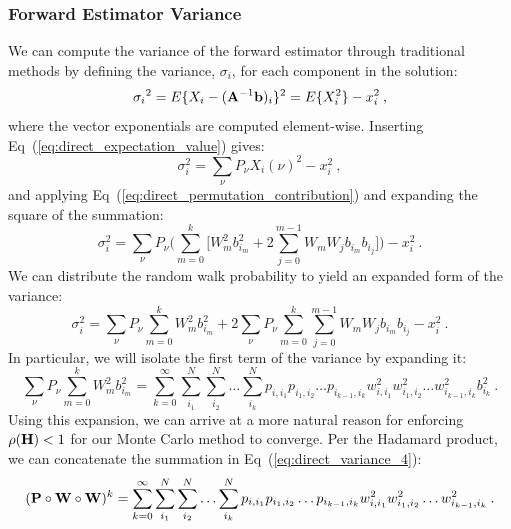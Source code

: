 \subsubsection{Forward Estimator Variance}
\label{subsec:forward_variance}
We can compute the variance of the forward estimator through traditional
methods by defining the variance, $\sigma_i$, for each component in
the solution:
\begin{equation}
  {\sigma_i}^2 = E\{X_i - (\mathbf{A}^{-1}\mathbf{b})_i\}^2 = E\{X_i^2\} - x_i^2\:,
  \label{eq:direct_variance_1}
\end{equation}
where the vector exponentials are computed element-wise. Inserting
Eq~(\ref{eq:direct_expectation_value}) gives:
\begin{equation}
  \sigma_i^2 = \sum_{\nu} P_{\nu} X_{i}(\nu)^2 - x_i^2\:,
  \label{eq:direct_variance_2}
\end{equation}
and applying Eq~(\ref{eq:direct_permutation_contribution}) and
expanding the square of the summation:
\begin{equation}
  \sigma_i^2 = \sum_{\nu} P_{\nu} \Big(\sum_{m=0}^k \Big[ W_{m}^2 b_{i_m}^2
  + 2 \sum_{j=0}^{m-1} W_m W_j b_{i_m} b_{i_j} \Big] \Big)-
  x_i^2\:.
  \label{eq:direct_variance_3}
\end{equation}
We can distribute the random walk probability to yield an expanded
form of the variance:
\begin{equation}
  \sigma_i^2 = \sum_{\nu} P_{\nu} \sum_{m=0}^k W_{m}^2 b_{i_m}^2 + 2
  \sum_{\nu} P_{\nu} \sum_{m=0}^k \sum_{j=0}^{m-1} W_m W_j b_{i_m}
  b_{i_j} - x_i^2\:.
  \label{eq:direct_variance_3_2}
\end{equation}
In particular, we will isolate the first term of the variance by
expanding it:
\begin{equation}
  \sum_{\nu} P_{\nu} \sum_{m=0}^k W_{m}^2 b_{i_m}^2 =
  \sum_{k=0}^{\infty}\sum_{i_1}^{N}\sum_{i_2}^{N}\ldots \sum_{i_k}^{N}
  p_{i,i_1}p_{i_1,i_2}\ldots p_{i_{k-1},i_k}
  w^2_{i,i_1}w^2_{i_1,i_2}\ldots w^2_{i_{k-1},i_k} b_{i_k}^2\:.
  \label{eq:direct_variance_4}
\end{equation}
Using this expansion, we can arrive at a more natural
reason for enforcing $\rho(\mathbf{H}) < 1$ for our Monte Carlo method to
converge. Per the Hadamard product, we can concatenate the summation
in Eq~(\ref{eq:direct_variance_4}):
\begin{equation}
  (\mathbf{P} \circ \mathbf{W} \circ \mathbf{W})^k =
  \sum_{k=0}^{\infty}\sum_{i_1}^{N}\sum_{i_2}^{N}\ldots \sum_{i_k}^{N}
  p_{i,i_1}p_{i_1,i_2}\ldots p_{i_{k-1},i_k}
  w^2_{i,i_1}w^2_{i_1,i_2}\ldots w^2_{i_{k-1},i_k}\:.
  \label{eq:double_weighted_decomposition}
\end{equation}
